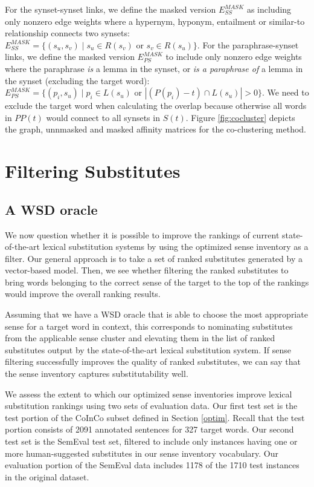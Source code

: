 \documentclass[11pt]{article}
\begin{document}
For the synset-synset links, we define the masked version $E_{SS}^{MASK}$ as including only nonzero edge weights where a hypernym, hyponym, entailment or similar-to relationship connects two synsets: $E_{SS}^{MASK} = \{(s_u, s_v) \mid s_u \in R(s_v) \text{ or } s_v \in R(s_u)\}$. For the paraphrase-synset links, we define the masked version $E_{PS}^{MASK}$ to include only nonzero edge weights where the paraphrase \textit{is} a lemma in the synset, or \textit{is a paraphrase of} a lemma in the synset (excluding the target word): $E_{PS}^{MASK} = \{(p_i, s_u) \mid p_i \in L(s_u) \text{ or } |(P(p_i)-t) \cap L(s_u)| > 0 \}$. We need to exclude the target word when calculating the overlap because otherwise all words in $PP(t)$ would connect to all synsets in $S(t)$. Figure \ref{fig:cocluster} depicts the graph, unnmasked and masked affinity matrices for the co-clustering method. 


\section{Filtering Substitutes}

\subsection{A WSD oracle}

We now question whether it is possible to improve the rankings of current state-of-the-art lexical substitution systems by using the optimized sense inventory as a filter. Our general approach is to take a set of ranked substitutes generated by a vector-based model. Then, we see whether filtering the ranked substitutes to bring words belonging to the correct sense of the target to the top of the rankings would improve the overall ranking results. 

Assuming that we have a WSD oracle that is able to choose the most appropriate sense for a target word in context, this corresponds to nominating substitutes from the applicable sense cluster and elevating them in the list of ranked substitutes output by the state-of-the-art lexical substitution system. 
If sense filtering successfully improves the quality of ranked substitutes, we can say that the sense inventory captures substitutability well. 


We assess the extent to which our optimized sense inventories improve lexical substitution rankings using two sets of evaluation data. Our first test set is the test portion of the CoInCo subset defined in Section \ref{optim}. Recall that the test portion consists of 2091 annotated sentences for 327 target words. Our second test set is the SemEval test set, filtered to include only instances having one or more human-suggested substitutes in our sense inventory vocabulary. Our evaluation portion of the SemEval data includes 1178 of the 1710 test instances in the original dataset.   
\end{document}

